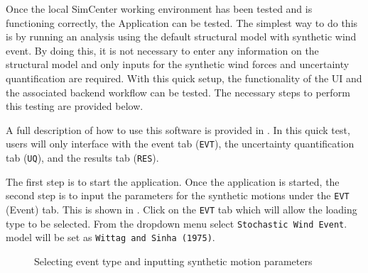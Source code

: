 Once the local SimCenter working environment has been tested and is
functioning correctly, the \texttt{\getsoftwarename{}} Application
can be tested. The simplest way to do this is by running an analysis
using the default structural model with synthetic wind event. By
doing this, it is not necessary to enter any information on the
structural model and only inputs for the synthetic wind forces 
and uncertainty quantification are required. With this quick setup, the
functionality of the \texttt{\getsoftwarename{}} UI and the associated backend
workflow can be tested. The necessary steps to perform this
testing are provided below.

A full description of how to use this software is provided
in .  In this quick test, users will only
interface with the event tab (\texttt{EVT}), the uncertainty
quantification tab (\texttt{UQ}), and the results tab (\texttt{RES}).

The first step is to start the \texttt{\getsoftwarename{}}
application.  Once the application is started, the second step is to
input the parameters for the synthetic motions under the \texttt{EVT}
(Event) tab. This is shown in . Click
on the \texttt{EVT} tab which will allow the loading type to be
selected. From the dropdown menu select \texttt{Stochastic Wind Event}. 
model will be set as \texttt{Wittag and Sinha (1975)}.

\begin{figure}[!htbp]
  \caption{Selecting event type and inputting synthetic motion parameters}
  \label{fig:input_event}
\end{figure}

